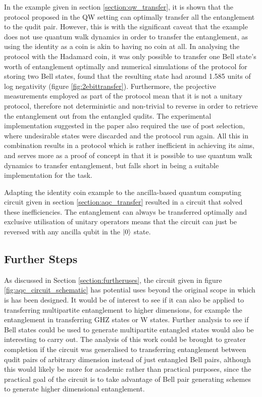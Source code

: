 In the example given in section \ref{section:qw_transfer}, it is shown that the protocol proposed in the QW setting can optimally transfer all the entanglement to the qudit pair.
However, this is with the significant caveat that the example does not use quantum walk dynamics in order to transfer the entanglement, as using the identity as a coin is akin to having no coin at all.
In analysing the protocol with the Hadamard coin, it was only possible to transfer one Bell state's worth of entanglement optimally and
numerical simulations of the protocol for storing two Bell states, found that the resulting state had around 1.585 units of log negativity (figure \ref{fig:2ebittransfer}).
Furthermore, the projective measurements employed as part of the protocol mean that it is not a unitary protocol, therefore not deterministic and non-trivial to reverse in order to retrieve the entanglement out from the entangled qudits.
The experimental implementation suggested in the paper also required the use of post selection, where undesirable states were discarded and the protocol run again.
All this in combination results in a protocol which is rather inefficient in achieving its aims, and serves more as a proof of concept in that it is possible to use quantum walk dynamics to transfer entanglement, but falls short in being a suitable implementation for the task.

Adapting the identity coin example to the ancilla-based quantum computing circuit given in section \ref{section:aqc_transfer} resulted in a circuit that solved these inefficiencies.
The entanglement can always be transferred optimally and exclusive utilisation of unitary operators means that the circuit can just be reversed with any ancilla qubit in the $\ket{0}$ state.

\subsection{Further Steps}
\label{subsection:furthersteps}
As discussed in Section \ref{section:furtheruses}, the circuit given in figure \ref{fig:aqc_circuit_schematic} has potential uses beyond the original scope in which is has been designed.
It would be of interest to see if it can also be applied to transferring multipartite entanglement to higher dimensions, for example the entanglement in transferring GHZ states or W states.
Further analysis to see if Bell states could be used to generate multipartite entangled states would also be interesting to carry out.
The analysis of this work could be brought to greater completion if the circuit was generalised to transferring entanglement between qudit pairs of arbitrary dimension instead of just entangled Bell pairs, although this would likely be more for academic rather than practical purposes, since the practical goal of the circuit is to take advantage of Bell pair generating schemes to generate higher dimensional entanglement.

